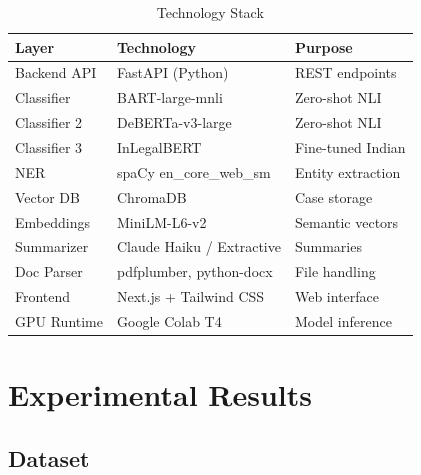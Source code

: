 \documentclass[conference]{IEEEtran}
\begin{document}
\begin{table}[ht]
\centering
\caption{Technology Stack}
\label{tab:tech}
\renewcommand{\arraystretch}{1.15}
\begin{tabular}{lll}
\toprule
\textbf{Layer} & \textbf{Technology} & \textbf{Purpose} \\
\midrule
Backend API  & FastAPI (Python)          & REST endpoints \\
Classifier   & BART-large-mnli           & Zero-shot NLI \\
Classifier 2 & DeBERTa-v3-large          & Zero-shot NLI \\
Classifier 3 & InLegalBERT               & Fine-tuned Indian \\
NER          & spaCy en\_core\_web\_sm   & Entity extraction \\
Vector DB    & ChromaDB                  & Case storage \\
Embeddings   & MiniLM-L6-v2              & Semantic vectors \\
Summarizer   & Claude Haiku / Extractive & Summaries \\
Doc Parser   & pdfplumber, python-docx   & File handling \\
Frontend     & Next.js + Tailwind CSS    & Web interface \\
GPU Runtime  & Google Colab T4           & Model inference \\
\bottomrule
\end{tabular}
\end{table}

\section{Experimental Results}

\subsection{Dataset}
\end{document}
